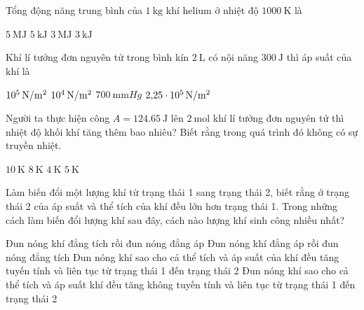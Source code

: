 \begin{ex}
Tổng động năng trung bình của $\SI{1}{\kilogram}$ khí helium ở nhiệt độ $\SI{1000}{\kelvin}$ là
	
	\choice
	{$\SI{5}{\mega\joule}$}
	{$\SI{5}{\kilo\joule}$}
	{\True $\SI{3}{\mega\joule}$}
	{$\SI{3}{\kilo\joule}$}
\end{ex}
\begin{ex}
	Khí lí tưởng đơn nguyên tử trong bình kín $\SI{2}{\liter}$ có nội năng $\SI{300}{\joule}$ thì áp suất của khí là 
	
	\choice
	{\True $\SI{E5}{\newton/\meter^2}$}
	{$\SI{E4}{\newton/\meter^2}$}
	{$\SI{700}{\milli\meter Hg}$}
	{$\SI{2.25E5}{\newton/\meter^2}$}
\end{ex}
\begin{ex}
	Người ta thực hiện công $A=\SI{124.65}{\joule}$ lên $\SI{2}{\mole}$ khí lí tưởng đơn nguyên tử thì nhiệt độ khối khí tăng thêm bao nhiêu? Biết rằng trong quá trình đó không có sự truyền nhiệt.
	
	\choice
	{$\SI{10}{\kelvin}$}
	{$\SI{8}{\kelvin}$}
	{$\SI{4}{\kelvin}$}
	{\True $\SI{5}{\kelvin}$}
\end{ex}
\begin{ex}
	Làm biến đổi một lượng khí từ trạng thái 1 sang trạng thái 2, biết rằng ở trạng thái 2 của áp suất và thể tích của khí đều lớn hơn trạng thái 1. Trong những cách làm biến đổi lượng khí sau đây, cách nào lượng khí sinh công nhiều nhất?
	
	\choice
	{\True Đun nóng khí đẳng tích rồi đun nóng đẳng áp}
	{Đun nóng khí đẳng áp rồi đun nóng đẳng tích}
	{Đun nóng khí sao cho cả thể tích và áp suất của khí đều tăng tuyến tính và liên tục từ trạng thái 1 đến trạng thái 2}
	{Đun nóng khí sao cho cả thể tích và áp suất khí đều tăng không tuyến tính và liên tục từ trạng thái 1 đến trạng thái 2}
	\loigiai{}
\end{ex}
